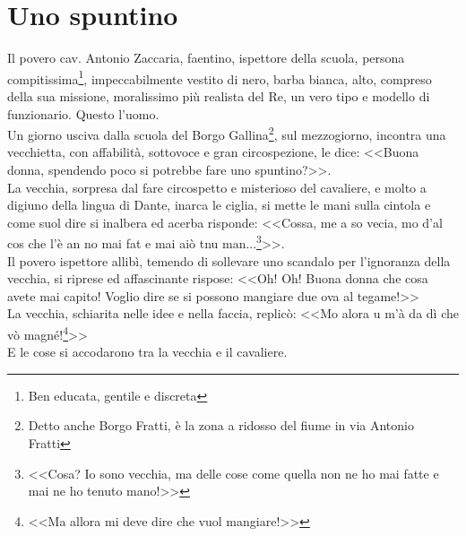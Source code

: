 
\chapter{Uno spuntino}
Il povero cav. Antonio Zaccaria, faentino, ispettore della scuola, persona compitissima\footnote{Ben educata, gentile e discreta}, impeccabilmente vestito di nero, barba bianca, alto, compreso della sua missione, moralissimo più realista del Re, un vero tipo e modello di funzionario. Questo l'uomo.\\
\indent Un giorno usciva dalla scuola del Borgo Gallina\footnote{Detto anche Borgo Fratti, è la zona a ridosso del fiume in via Antonio Fratti}, sul mezzogiorno, incontra una vecchietta, con affabilità, sottovoce e gran circospezione, le dice: <<Buona donna, spendendo poco si potrebbe fare uno spuntino?>>.\\
\indent La vecchia, sorpresa dal fare circospetto e misterioso del cavaliere, e molto a digiuno della lingua di Dante, inarca le ciglia, si mette le mani sulla cintola e come suol dire si inalbera ed acerba risponde: <<Cossa, me a so vecia, mo d'al cos che l'è an no mai fat e mai aiò tnu man...\footnote{<<Cosa? Io sono vecchia, ma delle cose come quella non ne ho mai fatte e mai ne ho tenuto mano!>>}>>.\\
\indent Il povero ispettore allibì, temendo di sollevare uno scandalo per l'ignoranza della vecchia, si riprese ed affascinante rispose: <<Oh! Oh! Buona donna che cosa avete mai capito! Voglio dire se si possono mangiare due ova al tegame!>>\\
\indent La vecchia, schiarita nelle idee e nella faccia, replicò: <<Mo alora u m'à da dì che vò magné!\footnote{<<Ma allora mi deve dire che vuol mangiare!>>}>>\\
\indent E le cose si accodarono tra la vecchia e il cavaliere.

